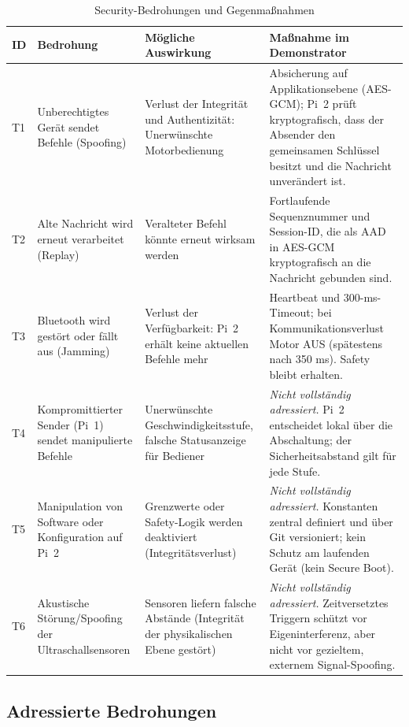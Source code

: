\begin{table}[H]
    \centering
    \small
    \begin{tabularx}{\textwidth}{@{}p{0.8cm}p{3.5cm}YY@{}}
        \toprule
        \textbf{ID} & \textbf{Bedrohung} & \textbf{Mögliche Auswirkung} & \textbf{Maßnahme im Demonstrator} \\
        \midrule
        T1 & Unberechtigtes Gerät sendet Befehle (Spoofing) & Verlust der Integrität und Authentizität: Unerwünschte Motorbedienung & Absicherung auf Applikationsebene (AES-GCM); Pi~2 prüft kryptografisch, dass der Absender den gemeinsamen Schlüssel besitzt und die Nachricht unverändert ist. \\
        T2 & Alte Nachricht wird erneut verarbeitet (Replay) & Veralteter Befehl könnte erneut wirksam werden & Fortlaufende Sequenznummer und Session-ID, die als AAD in AES-GCM kryptografisch an die Nachricht gebunden sind. \\
        T3 & Bluetooth wird gestört oder fällt aus (Jamming) & Verlust der Verfügbarkeit: Pi~2 erhält keine aktuellen Befehle mehr & Heartbeat und 300-ms-Timeout; bei Kommunikationsverlust Motor AUS (spätestens nach 350 ms). Safety bleibt erhalten. \\
        \midrule
        T4 & Kompromittierter Sender (Pi~1) sendet manipulierte Befehle & Unerwünschte Geschwindigkeitsstufe, falsche Statusanzeige für Bediener & \textit{Nicht vollständig adressiert.} Pi~2 entscheidet lokal über die Abschaltung; der Sicherheitsabstand gilt für jede Stufe. \\
        T5 & Manipulation von Software oder Konfiguration auf Pi~2 & Grenzwerte oder Safety-Logik werden deaktiviert (Integritätsverlust) & \textit{Nicht vollständig adressiert.} Konstanten zentral definiert und über Git versioniert; kein Schutz am laufenden Gerät (kein Secure Boot). \\
        T6 & Akustische Störung/Spoofing der Ultraschallsensoren & Sensoren liefern falsche Abstände (Integrität der physikalischen Ebene gestört) & \textit{Nicht vollständig adressiert.} Zeitversetztes Triggern schützt vor Eigeninterferenz, aber nicht vor gezieltem, externem Signal-Spoofing. \\
        \bottomrule
    \end{tabularx}
    \caption{Security-Bedrohungen und Gegenmaßnahmen}
    \label{tab:security-threats}
\end{table}

\subsection{Adressierte Bedrohungen}
\label{subsec:security-addressed}

